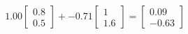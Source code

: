 \documentclass[preview]{standalone}
\begin{document}
\begin{align*}
1.00 \begin{bmatrix} 0.8 \\ 0.5 \end{bmatrix} + -0.71 \begin{bmatrix} 1 \\ 1.6 \end{bmatrix} = \begin{bmatrix} 0.09 \\ -0.63 \end{bmatrix}
\end{align*}
\end{document}
